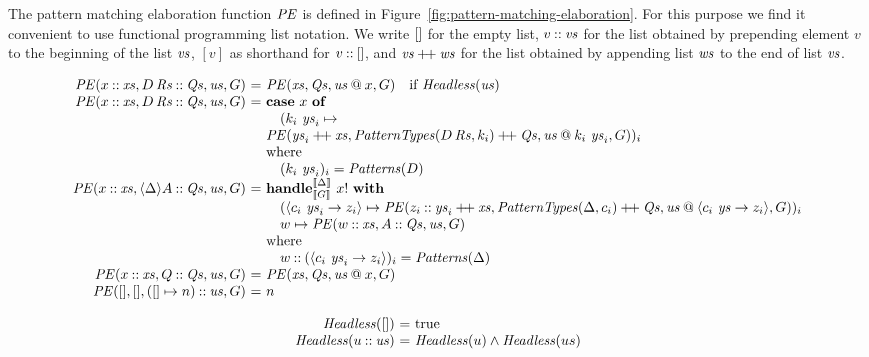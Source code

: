 \documentclass[12pt]{article}
\makeatletter
\newcommand{\sem}[1]{\llbracket{#1}\rrbracket}
\newcommand\ba{\begin{array}}
\newcommand\ea{\end{array}}
\newcommand{\bl}{\ba[t]{@{}l@{}}}
\newcommand{\el}{\ea}
\newenvironment{equations}{\[\ba{@{}r@{~}c@{~}l@{}}}{\ea\]\ignorespacesafterend}
\newcommand{\key}[1]{\textbf{#1}} %
\newcommand{\handleSymbol}{\rightarrow}
\newcommand{\handle}[2]{{#1} \handleSymbol {#2}}
\newcommand{\adj}{\Delta}
\newcommand{\effin}[1]{\langle {#1} \rangle}
\makeatother
\begin{document}
The pattern matching elaboration function $\mathit{PE}$ is defined in
Figure~\ref{fig:pattern-matching-elaboration}. For this purpose we
find it convenient to use functional programming list notation. We
write $[]$ for the empty list, $v \mathbin{::} \mathit{vs}$ for the list
obtained by prepending element $v$ to the beginning of the list $\mathit{vs}$,
$[v]$ as shorthand for $v \mathbin{::} []$, and $\mathit{vs} \mathbin{+\!+} \mathit{ws}$ for
the list obtained by appending list $\mathit{ws}$ to the end of list $\mathit{vs}$.
%
\begin{figure*}
\small
\begin{equations}
\PE(x \cons \xs, D\,\Rs \cons \Qs, \us, G) &=&
    \bl
    \PE(\xs, \Qs, \us \proj x, G)  \quad \text{if } \hdless(\us)
    \el \\
\PE(x \cons \xs, D\,\Rs \cons \Qs, \us, G) &=&
    \bl
    \key{case}~x~\key{of}\\
    \quad
      (k_i~\ys_i \mapsto \\
      \PE(\ys_i \concat \xs, \PatternTypes(D\,\Rs, k_i) \concat \Qs, \us \proj k_i~\ys_i, G))_i\\
    \text{where} \\
    \quad (k_i~\ys_i)_i = \Patterns(D) \\
    \el\\
\PE(x \cons \xs, \effin{\adj}A \cons \Qs, \us, G) &=&
    \bl
    \key{handle}^{\sem{\adj}}_{\sem{G}}~x!~\key{with} \\
    \quad
    \bl
      (\effin{\handle{c_i~\ys_i}{z_i}} \mapsto
         \PE(z_i \cons \ys_i \concat \xs, \PatternTypes(\adj, c_i) \concat \Qs, \us \proj \effin{\handle{c_i~\ys}{z_i}}, G))_i \\
      w \mapsto \PE(w \cons \xs, A \cons \Qs, \us, G) \\
    \el \\
    \text{where} \\
    \quad w \cons (\effin{\handle{c_i~\ys_i}{z_i}})_i = \Patterns(\adj) \\
    \el \\
\PE(x \cons \xs, Q \cons \Qs, \us, G) &=& \PE(\xs, \Qs, \us \proj x, G) \\
\PE(\emptylist, \emptylist, (\emptylist \mapsto n) \cons \us, G) &=& n \\
\end{equations}

\begin{equations}
  \hdless(\emptylist) &=& \true\\
  \hdless(u \cons \us) &=& \hdless(u) \wedge \hdless(us)\\[1ex]


\end{equations}
\end{figure*}
\end{document}

